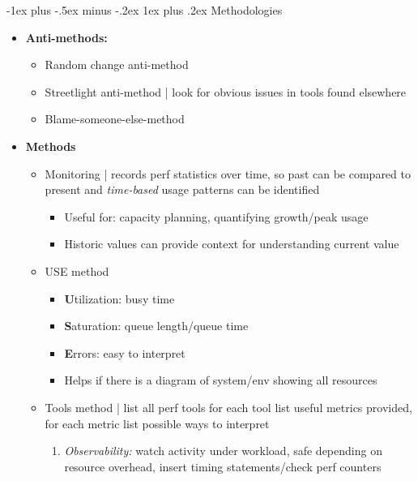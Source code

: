 \documentclass[10pt,landscape]{article}
\makeatletter
\newcommand{\subsubsubsection}{\@startsection{subsubsection}{3}{0mm}%
                                {-1ex plus -.5ex minus -.2ex}%
                                {1ex plus .2ex}%
                                {\normalfont\scriptsize\bfseries}}
\makeatother
\begin{document}
\begin{multicols*}{3}
\subsubsubsection{Methodologies}
\begin{itemize}[topsep=0pt,noitemsep,wide=0pt, leftmargin=\dimexpr{} + 2\relax]
    \item \textbf{Anti-methods:}
    \begin{itemize}[topsep=0pt,noitemsep,wide=0pt, leftmargin=\dimexpr{} + 2\relax]
        \item Random change anti-method
        \item Streetlight anti-method | look for obvious issues in tools found elsewhere
        \item Blame-someone-else-method
    \end{itemize}
    \item \textbf{Methods}
    \begin{itemize}[topsep=0pt,noitemsep,wide=0pt, leftmargin=\dimexpr{} + 2\relax]
        \item Monitoring | records perf statistics over time, so past can be compared to present and \textit{time-based} usage patterns can be identified
        \begin{itemize}[topsep=0pt,noitemsep,wide=0pt, leftmargin=\dimexpr{} + 2\relax]
            \item Useful for: capacity planning, quantifying growth/peak usage
            \item Historic values can provide context for understanding current value
        \end{itemize}
        \item USE method
        \begin{itemize}[topsep=0pt,noitemsep,wide=0pt, leftmargin=\dimexpr{} + 2\relax]
            \item \textbf{U}tilization: busy time
            \item \textbf{S}aturation: queue length/queue time
            \item \textbf{E}rrors: easy to interpret
            \item Helps if there is a diagram of system/env showing all resources
        \end{itemize}
        \item Tools method | list all perf tools for each tool list useful metrics provided, for each metric list possible ways to interpret
        \begin{enumerate}[topsep=0pt,noitemsep,wide=0pt, leftmargin=\dimexpr\labelwidth + 2\labelsep\relax]
            \item \textit{Observability:} watch activity under workload, safe depending on resource overhead, insert timing statements/check perf counters

\end{enumerate}
\end{itemize}
\end{itemize}
\end{multicols*}
\end{document}
